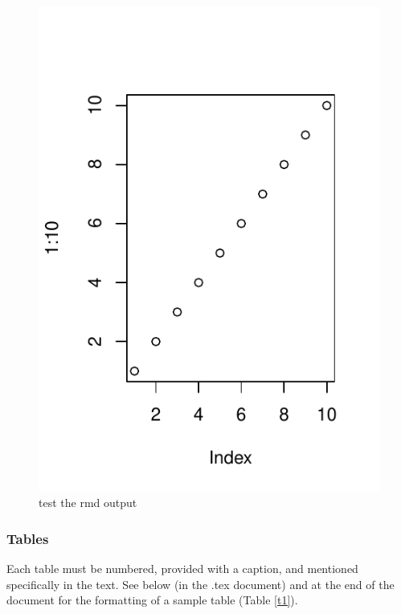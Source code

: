 \documentclass[draft]{ametsoc}
\begin{document}
\begin{figure}

{\centering \includegraphics{AMS_files/figure-latex/unnamed-chunk-1-1} 

}

\caption{test the rmd output}\label{fig:unnamed-chunk-1}
\end{figure}

\hypertarget{tables}{%
\subsubsection{Tables}\label{tables}}

Each table must be numbered, provided with a caption, and mentioned
specifically in the text. See below (in the .tex document) and at the
end of the document for the formatting of a sample table (Table
\ref{t1}).
\end{document}
